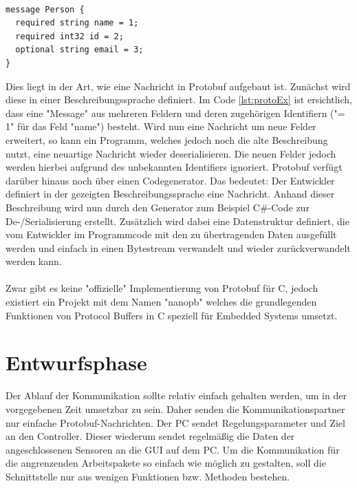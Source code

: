 \paragraph{}
\begin{lstlisting}[caption=Beispieldefinition einer Protocol Buffers Nachricht, label=lst:protoEx]
message Person {
  required string name = 1;
  required int32 id = 2;
  optional string email = 3;
}
\end{lstlisting}
Dies liegt in der Art, wie eine Nachricht in Protobuf aufgebaut ist. Zunächst wird diese in einer Beschreibungssprache definiert.
Im Code \ref{lst:protoEx} ist ersichtlich, dass eine "Message" aus mehreren Feldern und deren zugehörigen Identifiern ("= 1" für das Feld "name") besteht. Wird nun eine Nachricht um neue Felder erweitert, so kann ein Programm, welches jedoch noch die alte Beschreibung nutzt, eine neuartige Nachricht wieder deserialisieren. Die neuen Felder jedoch werden hierbei aufgrund des unbekannten Identifiers ignoriert. Protobuf verfügt darüber hinaus noch über einen Codegenerator. Das bedeutet: Der Entwickler definiert in der gezeigten Beschreibungssprache eine Nachricht. Anhand dieser Beschreibung wird nun durch den Generator zum Beispiel C\#-Code zur De-/Serialisierung erstellt. Zusätzlich wird dabei eine Datenstruktur definiert, die vom Entwickler im Programmcode mit den zu übertragenden Daten ausgefüllt werden und einfach in einen Bytestream verwandelt und wieder zurückverwandelt werden kann.
\paragraph{}
Zwar gibt es keine "offizielle" Implementierung von Protobuf für C, jedoch existiert ein Projekt mit dem Namen "nanopb" welches die grundlegenden Funktionen von Protocol Buffers in C speziell für Embedded Systems umsetzt.
\section{Entwurfsphase}
Der Ablauf der Kommunikation sollte relativ einfach gehalten werden, um in der vorgegebenen Zeit umsetzbar zu sein. Daher senden die Kommunikationspartner nur einfache Protobuf-Nachrichten. Der PC sendet Regelungsparameter und Ziel an den Controller. Dieser wiederum sendet regelmäßig die Daten der angeschlossenen Sensoren an die GUI auf dem PC. Um die Kommunikation für die angrenzenden Arbeitspakete so einfach wie möglich zu gestalten, soll die Schnittstelle nur aus wenigen Funktionen bzw. Methoden bestehen.
